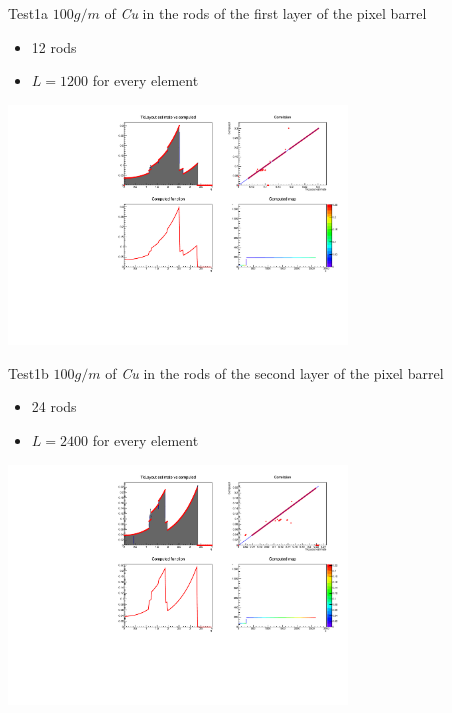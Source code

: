 \documentclass[pdftex, 11pt]{beamer}
\begin{document}
\begin{frame}
  \begin{block}{Test1a}
    \alert{$100 g/m$} of \emph{Cu} in the rods of the first layer of the pixel barrel
    \begin{itemize}
    \item \alert{12} rods
    \item \alert{$L=1200$} for every element
    \end{itemize}
  \end{block}
  \begin{center}
    \includegraphics[width=9cm]{img/test1a.pdf}
  \end{center}
\end{frame}

\begin{frame}
  \begin{block}{Test1b}
    \alert{$100 g/m$} of \emph{Cu}  in the rods of the second layer of the pixel barrel
    \begin{itemize}
    \item \alert{24} rods
    \item \alert{$L=2400$} for every element
    \end{itemize}
  \end{block}
  \begin{center}
    \includegraphics[width=9cm]{img/test1b.pdf}
  \end{center}
\end{frame}
\end{document}

